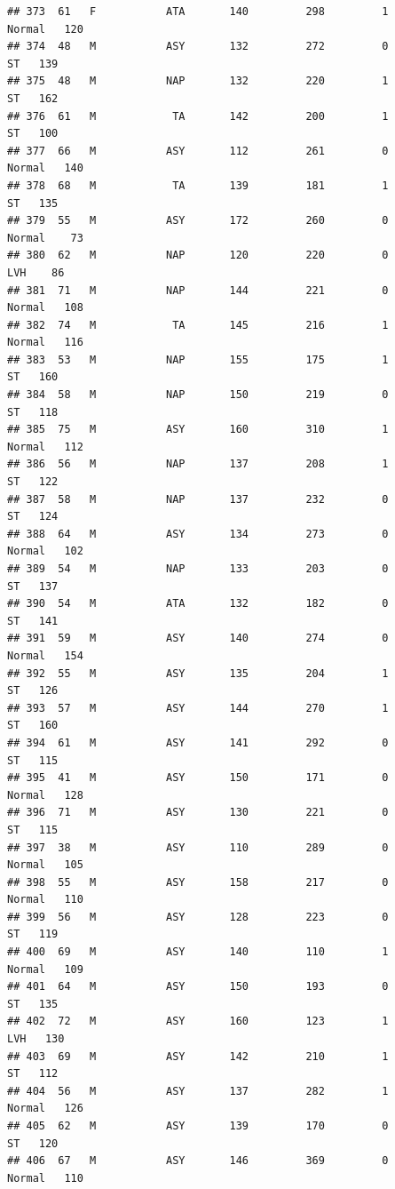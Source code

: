 \documentclass[
]{article}
\begin{document}
\begin{verbatim}
## 373  61   F           ATA       140         298         1     Normal   120
## 374  48   M           ASY       132         272         0         ST   139
## 375  48   M           NAP       132         220         1         ST   162
## 376  61   M            TA       142         200         1         ST   100
## 377  66   M           ASY       112         261         0     Normal   140
## 378  68   M            TA       139         181         1         ST   135
## 379  55   M           ASY       172         260         0     Normal    73
## 380  62   M           NAP       120         220         0        LVH    86
## 381  71   M           NAP       144         221         0     Normal   108
## 382  74   M            TA       145         216         1     Normal   116
## 383  53   M           NAP       155         175         1         ST   160
## 384  58   M           NAP       150         219         0         ST   118
## 385  75   M           ASY       160         310         1     Normal   112
## 386  56   M           NAP       137         208         1         ST   122
## 387  58   M           NAP       137         232         0         ST   124
## 388  64   M           ASY       134         273         0     Normal   102
## 389  54   M           NAP       133         203         0         ST   137
## 390  54   M           ATA       132         182         0         ST   141
## 391  59   M           ASY       140         274         0     Normal   154
## 392  55   M           ASY       135         204         1         ST   126
## 393  57   M           ASY       144         270         1         ST   160
## 394  61   M           ASY       141         292         0         ST   115
## 395  41   M           ASY       150         171         0     Normal   128
## 396  71   M           ASY       130         221         0         ST   115
## 397  38   M           ASY       110         289         0     Normal   105
## 398  55   M           ASY       158         217         0     Normal   110
## 399  56   M           ASY       128         223         0         ST   119
## 400  69   M           ASY       140         110         1     Normal   109
## 401  64   M           ASY       150         193         0         ST   135
## 402  72   M           ASY       160         123         1        LVH   130
## 403  69   M           ASY       142         210         1         ST   112
## 404  56   M           ASY       137         282         1     Normal   126
## 405  62   M           ASY       139         170         0         ST   120
## 406  67   M           ASY       146         369         0     Normal   110

\end{verbatim}
\end{document}

